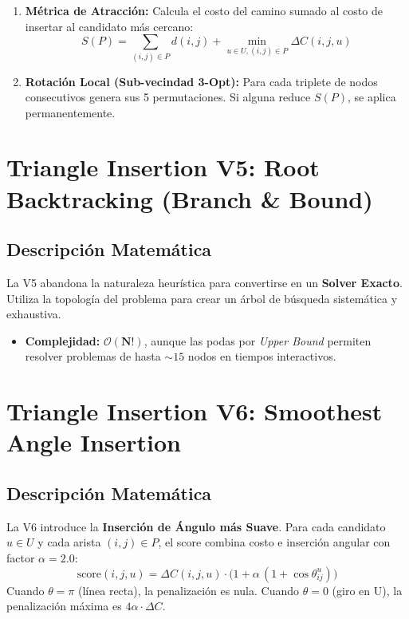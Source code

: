 \documentclass[12pt, a4paper]{article}
\begin{document}
\begin{enumerate}
    \item \textbf{Métrica de Atracción:} Calcula el costo del camino sumado al costo de insertar al candidato más cercano:
    \[
    S(P) = \sum_{(i,j) \in P} d(i,j) + \min_{u \in U, (i,j) \in P} \Delta C(i, j, u)
    \]
    \item \textbf{Rotación Local (Sub-vecindad 3-Opt):} Para cada triplete de nodos consecutivos genera sus 5 permutaciones. Si alguna reduce $S(P)$, se aplica permanentemente.
\end{enumerate}

\section{Triangle Insertion V5: Root Backtracking (Branch \& Bound)}

\subsection{Descripción Matemática}
La V5 abandona la naturaleza heurística para convertirse en un \textbf{Solver Exacto}. Utiliza la topología del problema para crear un árbol de búsqueda sistemática y exhaustiva.

\begin{itemize}
    \item \textbf{Complejidad:} $\mathbf{\mathcal{O}(N!)}$, aunque las podas por \textit{Upper Bound} permiten resolver problemas de hasta $\sim 15$ nodos en tiempos interactivos.
\end{itemize}

\section{Triangle Insertion V6: Smoothest Angle Insertion}

\subsection{Descripción Matemática}
La V6 introduce la \textbf{Inserción de Ángulo más Suave}. Para cada candidato $u \in U$ y cada arista $(i, j) \in P$, el score combina costo e inserción angular con factor $\alpha = 2.0$:
\[
\text{score}(i, j, u) = \Delta C(i,j,u) \cdot \big(1 + \alpha\,(1 + \cos\theta_{ij}^u)\big)
\]
Cuando $\theta = \pi$ (línea recta), la penalización es nula. Cuando $\theta = 0$ (giro en U), la penalización máxima es $4\alpha \cdot \Delta C$.
\end{document}

